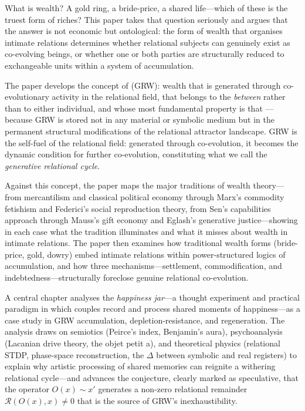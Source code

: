 What is wealth? A gold ring, a bride-price, a shared life---which of these is the truest form of riches? This paper takes that question seriously and argues that the answer is not economic but ontological: the form of wealth that organises intimate relations determines whether relational subjects can genuinely exist as co-evolving beings, or whether one or both parties are structurally reduced to exchangeable units within a system of accumulation.

The paper develops the concept of  (GRW): wealth that is generated through co-evolutionary activity in the relational field, that belongs to the \emph{between} rather than to either individual, and whose most fundamental property is that ---because GRW is stored not in any material or symbolic medium but in the permanent structural modifications of the relational attractor landscape. GRW is the self-fuel of the relational field: generated through co-evolution, it becomes the dynamic condition for further co-evolution, constituting what we call the \emph{generative relational cycle}.

Against this concept, the paper maps the major traditions of wealth theory---from mercantilism and classical political economy through Marx's commodity fetishism and Federici's social reproduction theory, from Sen's capabilities approach through Mauss's gift economy and Eglash's generative justice---showing in each case what the tradition illuminates and what it misses about wealth in intimate relations. The paper then examines how traditional wealth forms (bride-price, gold, dowry) embed intimate relations within power-structured logics of accumulation, and how three mechanisms---settlement, commodification, and indebtedness---structurally foreclose genuine relational co-evolution.

A central chapter analyses the \emph{happiness jar}---a thought experiment and practical paradigm in which couples record and process shared moments of happiness---as a case study in GRW accumulation, depletion-resistance, and regeneration. The analysis draws on semiotics (Peirce's index, Benjamin's aura), psychoanalysis (Lacanian drive theory, the objet petit a), and theoretical physics (relational STDP, phase-space reconstruction, the $\Delta$ between symbolic and real registers) to explain why artistic processing of shared memories can reignite a withering relational cycle---and advances the conjecture, clearly marked as speculative, that the operator $O(x) \sim x'$ generates a non-zero relational remainder $\mathcal{R}(O(x), x) \neq 0$ that is the source of GRW's inexhaustibility.

